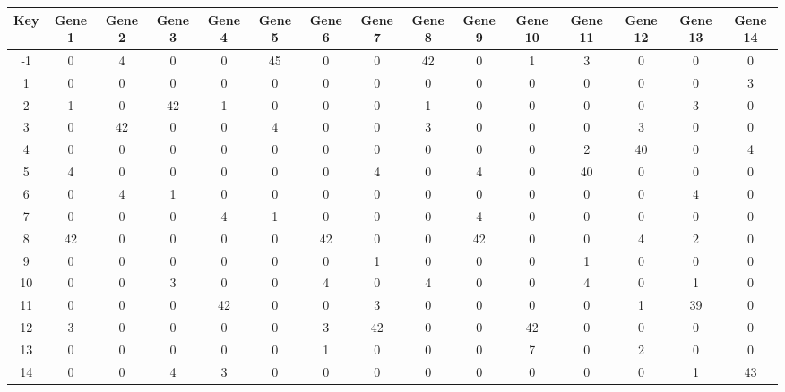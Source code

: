 \begin{tabular}{|c|c|c|c|c|c|c|c|c|c|c|c|c|c|c|}
\hline
Key & Gene 1 & Gene 2 & Gene 3 & Gene 4 & Gene 5 & Gene 6 & Gene 7 & Gene 8 & Gene 9 & Gene 10 & Gene 11 & Gene 12 & Gene 13 & Gene 14 \\
\hline
-1 & 0 & 4 & 0 & 0 & 45 & 0 & 0 & 42 & 0 & 1 & 3 & 0 & 0 & 0 \\
1 & 0 & 0 & 0 & 0 & 0 & 0 & 0 & 0 & 0 & 0 & 0 & 0 & 0 & 3 \\
2 & 1 & 0 & 42 & 1 & 0 & 0 & 0 & 1 & 0 & 0 & 0 & 0 & 3 & 0 \\
3 & 0 & 42 & 0 & 0 & 4 & 0 & 0 & 3 & 0 & 0 & 0 & 3 & 0 & 0 \\
4 & 0 & 0 & 0 & 0 & 0 & 0 & 0 & 0 & 0 & 0 & 2 & 40 & 0 & 4 \\
5 & 4 & 0 & 0 & 0 & 0 & 0 & 4 & 0 & 4 & 0 & 40 & 0 & 0 & 0 \\
6 & 0 & 4 & 1 & 0 & 0 & 0 & 0 & 0 & 0 & 0 & 0 & 0 & 4 & 0 \\
7 & 0 & 0 & 0 & 4 & 1 & 0 & 0 & 0 & 4 & 0 & 0 & 0 & 0 & 0 \\
8 & 42 & 0 & 0 & 0 & 0 & 42 & 0 & 0 & 42 & 0 & 0 & 4 & 2 & 0 \\
9 & 0 & 0 & 0 & 0 & 0 & 0 & 1 & 0 & 0 & 0 & 1 & 0 & 0 & 0 \\
10 & 0 & 0 & 3 & 0 & 0 & 4 & 0 & 4 & 0 & 0 & 4 & 0 & 1 & 0 \\
11 & 0 & 0 & 0 & 42 & 0 & 0 & 3 & 0 & 0 & 0 & 0 & 1 & 39 & 0 \\
12 & 3 & 0 & 0 & 0 & 0 & 3 & 42 & 0 & 0 & 42 & 0 & 0 & 0 & 0 \\
13 & 0 & 0 & 0 & 0 & 0 & 1 & 0 & 0 & 0 & 7 & 0 & 2 & 0 & 0 \\
14 & 0 & 0 & 4 & 3 & 0 & 0 & 0 & 0 & 0 & 0 & 0 & 0 & 1 & 43 \\
\hline
\end{tabular}